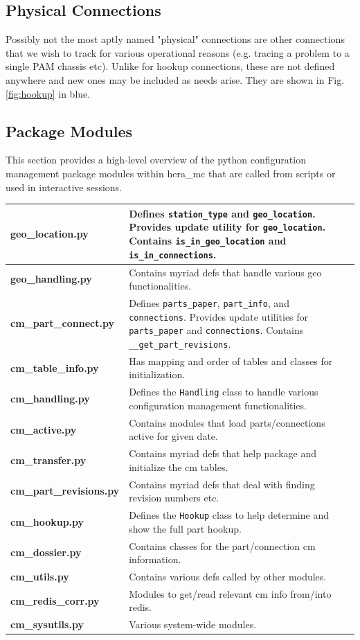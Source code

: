 \documentclass{article}
\begin{document}
\subsection{Physical Connections}
Possibly not the most aptly named "physical" connections are other connections that we wish to track for various operational reasons (e.g. tracing a problem to a single PAM chassis etc).  Unlike for hookup connections, these are not defined anywhere and new ones may be included as needs arise.  They are shown in Fig. \ref{fig:hookup} in blue.

\subsection{Package Modules}
This section provides a high-level overview of the python configuration management package modules within hera\_mc that are called from scripts or used in interactive sessions.
\vspace{0.5cm}

\begin{tabular}{l p{12cm}}
{\bf geo\_location.py} & Defines {\tt station\_type} and {\tt geo\_location}.  Provides update utility for {\tt geo\_location}.  Contains {\tt is\_in\_geo\_location} and {\tt is\_in\_connections}. \\ \hline
{\bf geo\_handling.py} & Contains myriad defs that handle various geo functionalities.\\ \hline
{\bf cm\_part\_connect.py} & Defines {\tt parts\_paper}, {\tt part\_info}, and {\tt connections}.  Provides update utilities for {\tt parts\_paper} and {\tt connections}. Contains {\tt \_\_get\_part\_revisions}. \\ \hline
{\bf cm\_table\_info.py} & Has mapping and order of tables and classes for initialization. \\ \hline
{\bf cm\_handling.py} & Defines the {\tt Handling} class to handle various configuration management functionalities.\\ \hline
{\bf cm\_active.py} & Contains modules that load parts/connections active for given date. \\ \hline
{\bf cm\_transfer.py} & Contains myriad defs that help package and initialize the cm tables.\\ \hline
{\bf cm\_part\_revisions.py} & Contains myriad defs that deal with finding revision numbers etc.\\ \hline
{\bf cm\_hookup.py} & Defines the {\tt Hookup} class to help determine and show the full part hookup.\\ \hline
{\bf cm\_dossier.py} & Contains classes for the part/connection cm information.\\ \hline
{\bf cm\_utils.py} & Contains various defs called by other modules.\\ \hline
{\bf cm\_redis\_corr.py} & Modules to get/read relevant cm info from/into redis.\\ \hline
{\bf cm\_sysutils.py} & Various system-wide modules.
\end{tabular}
\end{document}
